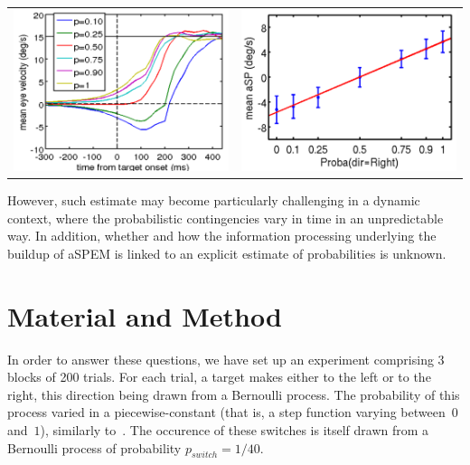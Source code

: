 \documentclass[profile,final,english, draft]{article}%
\begin{document}
\begin{tabular}{cc} 
    \includegraphics[width=.49\linewidth]{image_anna_1} & 	\includegraphics[width=.49\linewidth]{image_anna_2}
\end{tabular}

However, such estimate may become particularly challenging in a dynamic context, where the probabilistic contingencies vary in time in an unpredictable way. In addition, whether and how the information processing underlying the buildup of aSPEM is linked to an explicit estimate of probabilities is unknown.


\section*{Material and Method}

In order to answer these questions, we have set up an experiment comprising 3 blocks of 200 trials. For each trial, a target makes either to the left or to the right, this direction being drawn from a Bernoulli process. The probability of this process varied in a piecewise-constant (that is, a step function varying between~$0$ and~$1$), similarly to~\textcite{Meyniel13}. The occurence of these switches is itself drawn from a Bernoulli process of probability $p_{switch}=1/40$.
\end{document}
